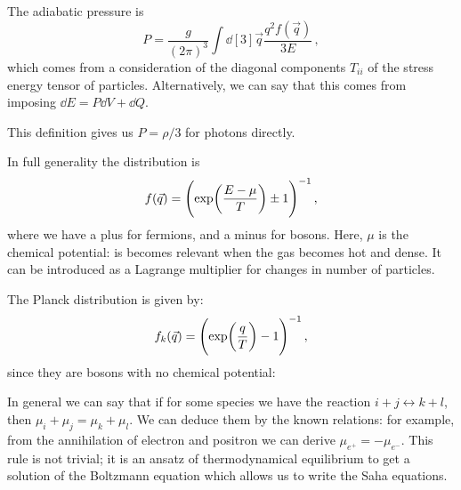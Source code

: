 \documentclass[main.tex]{subfiles}
\begin{document}
The adiabatic pressure is 
%
\begin{equation}
  P = \frac{g}{(2 \pi )^3} \int \dd[3]{\vec{q}} \frac{q^2 f(\vec{q})}{3E} 
\,,
\end{equation}
%
which comes from a consideration of the diagonal components \(T_{ii}\) of the stress energy tensor of particles. Alternatively, we can say that this comes from imposing \(\dd{E} = P \dd{V} + \dd{Q} \).

This definition gives us \(P = \rho /3\) for photons directly.

In full generality the distribution is 
%
\begin{equation}
  f(\vec{q}) = \qty(\exp(\frac{E- \mu }{T}) \pm 1 )^{-1}
\,,
\end{equation}
%
where we have a plus for fermions, and a minus for bosons. Here, \(\mu \) is the chemical potential: is becomes relevant when the gas becomes hot and dense.
It can be introduced as a Lagrange multiplier for changes in number of particles.

The Planck distribution is given by: 
%
\begin{equation}
  f_k(\vec{q}) = \qty(\exp(\frac{q}{T}) -1 )^{-1}
\,,
\end{equation}
%
since they are bosons with no chemical potential:

In general we can say that if for some species we have the reaction \(i+j \leftrightarrow k+l\), then \(\mu _i + \mu _j = \mu _k + \mu _l\). We can deduce them by the known relations: for example, from the annihilation of electron and positron we can derive \(\mu _{e^{+}} = - \mu_{e^{-}}\).
This rule is not trivial; it is an ansatz of thermodynamical equilibrium to get a solution of the Boltzmann equation which allows us to write the Saha equations.
\end{document}
